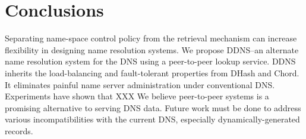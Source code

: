 \section{Conclusions}

Separating name-space control policy from the 
retrieval mechanism can increase flexibility 
in designing name resolution systems. 
We propose DDNS--an alternate name resolution system
for the DNS using a peer-to-peer lookup service. 
DDNS inherits the load-balancing and fault-tolerant 
properties from DHash and Chord. It eliminates 
painful name server administration under 
conventional DNS.
Experiments have shown that XXX
We believe peer-to-peer systems is a promising 
alternative to serving DNS data.
Future work must be done to address various
incompatibilities with the current DNS, especially 
dynamically-generated records.
